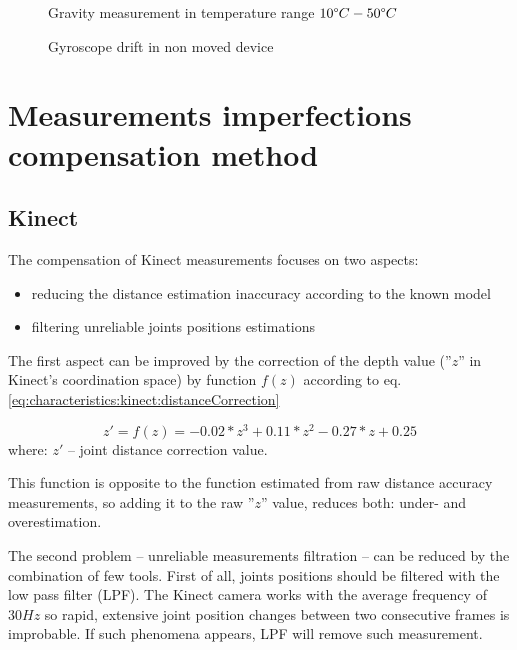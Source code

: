 \documentclass{llncs}
\begin{document}
\begin{figure}[h!]
	\centering 
	\begin{minipage}[b]{0.49\linewidth}
		\centering 
		\vspace{2.5cm}
		\caption{Gravity measurement in temperature range $10\degree C - 50\degree C$}
		\label{fig:characteristics:imu:imuTemp}
	\end{minipage}
	\begin{minipage}[b]{0.49\linewidth}
		\centering 
		\vspace{2.5cm}
		\caption{Gyroscope drift in non moved device}
		\label{fig:characteristics:imu:gyroDrift}
	\end{minipage}
\end{figure}

\section{Measurements imperfections compensation method}
\subsection{Kinect}
The compensation of Kinect measurements focuses on two aspects:
\begin{itemize}
	\item reducing the distance estimation inaccuracy according to the known model
	\item filtering unreliable joints positions estimations
\end{itemize}

The first aspect can be improved by the correction of the depth value (''$z$'' in Kinect's coordination space) by function $f(z)$ according to eq. \eqref{eq:characteristics:kinect:distanceCorrection} 

\begin{equation}
	z' = f(z) = -0.02*z^3 + 0.11*z^2 - 0.27*z + 0.25
	\label{eq:characteristics:kinect:distanceCorrection}
\end{equation}
where: $z'$ -- joint distance correction value.

This function is opposite to the function estimated from raw distance accuracy measurements, so adding it to the raw ''$z$'' value, reduces both: under- and overestimation.

The second problem -- unreliable measurements filtration -- can be reduced by the combination of few tools. First of all, joints positions should be filtered with the low pass filter (LPF). The Kinect camera works with the average frequency of $30Hz$ so rapid, extensive joint position changes between two consecutive frames is improbable. If such phenomena appears, LPF will remove such measurement. 
\end{document}
